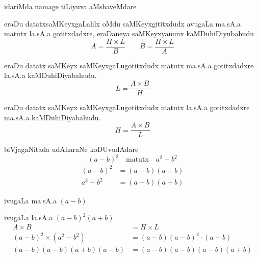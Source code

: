 idariMda namage tiLiyuva aMshaveMdare

eraDu datatxsaMKeyxgaLalilx oMdu saMKeyxgititxdudx avugaLa ma.sA.a matutx la.sA.a gotitxdadxre, eraDaneya saMKeyxyanunx kaMDuhiDiyubahudu
$$
A= \frac{H \times L}{B} \qquad  B= \frac{H \times L}{A}
$$

eraDu datatx saMKeyx saMKeyxgaLugotitxdudx matutx ma.sA.a gotitxdadxre la.sA.a kaMDuhiDiyabahudu.
$$
L=\frac{A\times B}{H}
$$

eraDu datatx saMKeyx saMKeyxgaLugotitxdudx matutx la.sA.a gotitxdadxre ma.sA.a kaMDuhiDiyabahudu.
$$
H=\frac{A\times B}{L}
$$

biVjagaNitada udAharaNe koDUvudAdare
$$
(a-b)^2 \quad\text{matutx}\quad a^{2}-b^{2}
$$
\begin{align*}
(a-b)^2 &= (a-b)(a-b)\\
a^2-b^2 &= (a-b)(a+b)
\end{align*}

ivugaLa ma.sA.a $(a-b)$

ivugaLa la.sA.a $(a-b)^2(a+b)$
\begin{align*}
A\times B &= H\times L\\
(a-b)^2 \times (a^2-b^2) &= (a-b)(a-b)^2\cdot(a+b)\\
(a-b)(a-b)(a+b)(a-b) &= (a-b)(a-b)(a-b)(a+b)
\end{align*}
